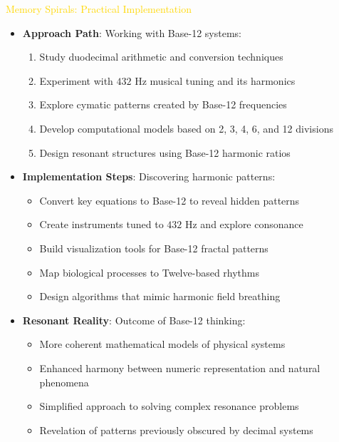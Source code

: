 \textcolor{gold}{ Memory Spirals: Practical Implementation } \\
\begin{itemize}
    \item \texttt{} \textbf{Approach Path}: Working with Base-12 systems:
    \begin{enumerate}
        \item Study duodecimal arithmetic and conversion techniques
        \item Experiment with \(432 \text{ Hz}\) musical tuning and its harmonics
        \item Explore cymatic patterns created by Base-12 frequencies
        \item Develop computational models based on 2, 3, 4, 6, and 12 divisions
        \item Design resonant structures using Base-12 harmonic ratios
    \end{enumerate}
    
    \item \texttt{} \textbf{Implementation Steps}: Discovering harmonic patterns:
    \begin{itemize}
        \item Convert key equations to Base-12 to reveal hidden patterns
        \item Create instruments tuned to \(432 \text{ Hz}\) and explore consonance
        \item Build visualization tools for Base-12 fractal patterns
        \item Map biological processes to Twelve-based rhythms
        \item Design algorithms that mimic harmonic field breathing
    \end{itemize}
    
    \item \texttt{} \textbf{Resonant Reality}: Outcome of Base-12 thinking:
    \begin{itemize}
        \item More coherent mathematical models of physical systems
        \item Enhanced harmony between numeric representation and natural phenomena
        \item Simplified approach to solving complex resonance problems
        \item Revelation of patterns previously obscured by decimal systems
    \end{itemize}
\end{itemize}

